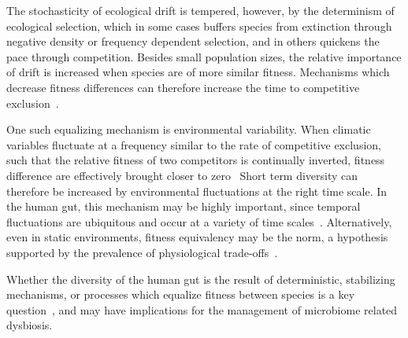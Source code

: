 \documentclass[12pt]{article}
\begin{document}
The stochasticity of ecological drift is tempered, however,
by the determinism of ecological selection,
which in some cases buffers species from extinction through
negative density or frequency dependent selection,
and in others quickens the pace through competition.
Besides small population sizes, the relative importance of
drift is increased when species are of more similar fitness.
Mechanisms which decrease fitness differences can therefore
increase the time to competitive
exclusion~\citep{Chesson2000,Adler2007}.

One such equalizing mechanism is environmental variability.
When climatic variables fluctuate at a frequency similar to the
rate of competitive exclusion, such that the relative fitness of
two competitors is continually inverted,
fitness difference are effectively brought closer
to zero~\citep{Hutchinson1961,Chesson1981}
Short term diversity can therefore be increased by
environmental fluctuations at the right time scale.
In the human gut, this mechanism may be highly important,
since temporal fluctuations are ubiquitous and occur at a
variety of time scales~\citep{TODO}.
Alternatively, even in static environments,
fitness equivalency may be the norm,
a hypothesis supported by the prevalence of
physiological trade-offs~\citep{TODO}.

Whether the diversity of the human gut is the result of
deterministic, stabilizing mechanisms, or processes which equalize
fitness between species is a key question~\citep{Adler2007},
and may have implications for the management of microbiome related
dysbiosis.
\end{document}
